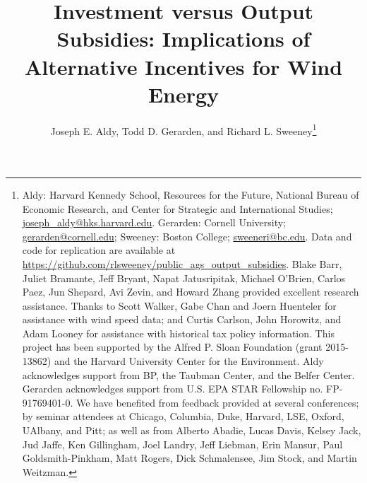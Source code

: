 \documentclass[12pt]{article}
\begin{document}
\title{Investment versus Output Subsidies: Implications of Alternative Incentives for Wind Energy}

\author{Joseph E. Aldy, Todd D. Gerarden, and Richard L. Sweeney\thanks{\protect Aldy: Harvard Kennedy School, Resources for the Future, National Bureau of Economic Research, and Center for Strategic and International Studies; \protect\href{mailto:joseph_aldy@hks.harvard.edu}{joseph\_{}aldy@hks.harvard.edu}. Gerarden: Cornell University; \protect\href{mailto: gerarden@cornell.edu}{ gerarden@cornell.edu};
Sweeney: Boston College; \protect\href{mailto:sweeneri@bc.edu}{sweeneri@bc.edu}. \newline \protect\hphantom{} \hspace{3ex} Data and code for replication are available at \protect\href{https://github.com/rlsweeney/public_ags_output_subsidies}{https://github.com/rlsweeney/public\_ags\_output\_subsidies}. \newline \protect\hphantom{} \hspace{3ex} Blake Barr, Juliet Bramante, Jeff Bryant, Napat Jatusripitak, Michael O'Brien, Carlos Paez, Jun Shepard, Avi Zevin, and Howard Zhang provided excellent research assistance. Thanks to Scott Walker, Gabe Chan and Joern Huenteler for assistance with wind speed data; and Curtis Carlson, John Horowitz, and Adam Looney for assistance with historical tax policy information. This project has been supported by the Alfred P. Sloan Foundation (grant 2015-13862) and the Harvard University Center for the Environment. Aldy acknowledges support from BP, the Taubman Center, and the Belfer Center. Gerarden acknowledges support from U.S. EPA STAR Fellowship no. FP-91769401-0. We have benefited from feedback provided at several conferences; by seminar attendees at Chicago, Columbia, Duke, Harvard, LSE, Oxford, UAlbany, and Pitt; as well as from Alberto Abadie, Lucas Davis, Kelsey Jack, Jud Jaffe, Ken Gillingham, Joel Landry, Jeff Liebman, Erin Mansur, Paul Goldsmith-Pinkham, Matt Rogers, Dick Schmalensee, Jim Stock, and Martin Weitzman. }}
\end{document}
